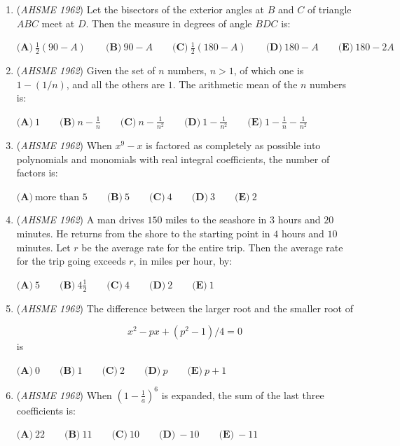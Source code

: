 \begin{enumerate}
	\item (\textit{AHSME 1962}) Let the bisectors of the exterior angles at $B$ and $C$ of triangle $ABC$ meet at $D$. Then the measure in degrees of angle $BDC$ is:


 $\textbf{(A)}\ \frac{1}{2}(90 - A) \qquad  \textbf{(B)}\ 90 - A \qquad  \textbf{(C)}\ \frac{1}{2}(180 - A) \qquad  \textbf{(D)}\ 180 - A \qquad  \textbf{(E)}\ 180 - 2A$


	\item (\textit{AHSME 1962}) Given the set of $n$ numbers, $n > 1$, of which one is $1 - (1/n)$, and all the others are $1$. The arithmetic mean of the $n$ numbers is:


 $\textbf{(A)}\ 1 \qquad  \textbf{(B)}\ n - \frac{1}{n} \qquad  \textbf{(C)}\ n - \frac{1}{n^2} \qquad  \textbf{(D)}\ 1 - \frac{1}{n^2} \qquad  \textbf{(E)}\ 1 - \frac{1}{n} - \frac{1}{n^2}$


	\item (\textit{AHSME 1962}) When $x^9 - x$ is factored as completely as possible into polynomials and monomials with real integral coefficients, the number of factors is:


 $\textbf{(A)}\ \text{more than } 5 \qquad  \textbf{(B)}\ 5 \qquad  \textbf{(C)}\ 4 \qquad  \textbf{(D)}\ 3 \qquad  \textbf{(E)}\ 2$


	\item (\textit{AHSME 1962}) A man drives $150$ miles to the seashore in $3$ hours and $20$ minutes. He returns from the shore to the starting point in $4$ hours and $10$ minutes. Let $r$ be the average rate for the entire trip. Then the average rate for the trip going exceeds $r$, in miles per hour, by:


 $\textbf{(A)}\ 5 \qquad  \textbf{(B)}\ 4\frac{1}{2} \qquad  \textbf{(C)}\ 4 \qquad  \textbf{(D)}\ 2 \qquad  \textbf{(E)}\ 1$


	\item (\textit{AHSME 1962}) The difference between the larger root and the smaller root of

 \[x^2 - px + (p^2 - 1)/4 = 0\]
is


 $\textbf{(A)}\ 0 \qquad  \textbf{(B)}\ 1 \qquad  \textbf{(C)}\ 2 \qquad  \textbf{(D)}\ p \qquad  \textbf{(E)}\ p + 1$


	\item (\textit{AHSME 1962}) When $\left(1 - \frac{1}{a}\right)^6$ is expanded, the sum of the last three coefficients is:


 $\textbf{(A)}\ 22 \qquad  \textbf{(B)}\ 11 \qquad  \textbf{(C)}\ 10 \qquad  \textbf{(D)}\ -10 \qquad  \textbf{(E)}\ -11$



\end{enumerate}
